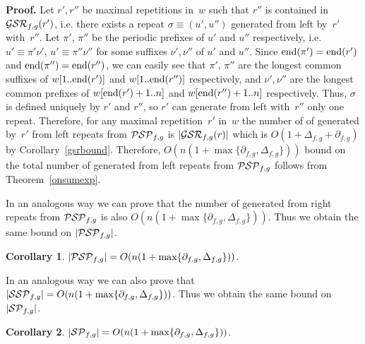 \documentclass{article}
\newtheorem{corollary}{Corollary}
\begin{document}
{\bf Proof.} Let $r', r''$ be maximal repetitions in~$w$ such that
$r''$ is contained in ${\cal GSR}_{f,g} (r')$, i.e. there exists
a repeat $\sigma\equiv (u', u'')$ generated from left by~$r'$ with~$r''$.
Let $\pi'$, $\pi''$ be the periodic prefixes of $u'$ and $u''$ respectively,
i.e. $u'\equiv\pi'\nu'$, $u'\equiv\pi''\nu''$ for some suffixes 
$\nu',\nu''$ of $u'$ and $u''$. Since ${\rm end} (\pi')={\rm end} (r')$
and ${\rm end} (\pi'')={\rm end} (r'')$, we can easily see that $\pi'$,
$\pi''$ are the longest common suffixes of $w[1 .. {\rm end} (r')]$ and 
$w[1 .. {\rm end} (r'')]$ respectively, and $\nu',\nu''$ are the 
longest common prefixes of $w[{\rm end} (r')+1 .. n]$ and $w[{\rm end} (r'')+1 .. n]$
respectively. Thus, $\sigma$ is defined uniquely by $r'$ and $r''$, so
$r'$ can generate from left with~$r''$ only one repeat. Therefore, for
any maximal repetition~$r'$ in~$w$ the number of of generated by~$r'$ 
from left repeats from ${\cal PSP}_{f,g}$ is $|{\cal GSR}_{f,g} (r)|$
which is $O(1+\Delta_{f, g}+\partial_{f, g})$ by Corollary~\ref{gsrbound}.
Therefore, $O(n(1+\max\{\partial_{f, g}, \Delta_{f, g}\}))$ bound on the total
number of generated from left repeats from ${\cal PSP}_{f,g}$ follows from
Theorem~\ref{onsumexp}.

In an analogous way we can prove that the number of generated from right
repeats from ${\cal PSP}_{f,g}$ is also $O(n(1+\max\{\partial_{f, g}, \Delta_{f, g}\}))$.
Thus we obtain the same bound on $|{\cal PSP}_{f,g}|$.

\begin{corollary}
$|{\cal PSP}_{f,g}|=O(n(1+\max\{\partial_{f, g}, \Delta_{f, g}\}))$.
\label{onPSP}
\end{corollary}

In an analogous way we can also prove that $|{\cal SSP}_{f,g}|=O(n(1+\max\{\partial_{f, g}, \Delta_{f, g}\}))$.
Thus we obtain the same bound on $|{\cal SP}_{f,g}|$.

\begin{corollary}
$|{\cal SP}_{f,g}|=O(n(1+\max\{\partial_{f, g}, \Delta_{f, g}\}))$.
\label{onSP} 
\end{corollary}
\end{document}
